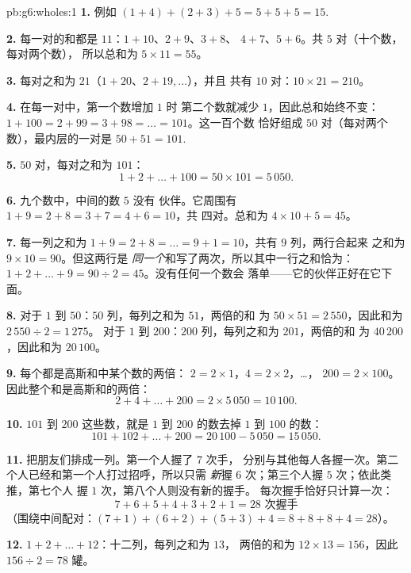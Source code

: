 \begin{solution}{pb:g6:wholes:1}
\textbf{1.} 例如 $(1 + 4) + (2 + 3) + 5 = 5 + 5 + 5 =
15$.

\textbf{2.} 每一对的和都是 $11$：$1 + 10$、$2 + 9$、$3 + 8$、
$4 + 7$、$5 + 6$。共 $5$ 对（十个数，每对两个数），
所以总和为 $5 \times 11 = 55$。

\textbf{3.} 每对之和为 $21$（$1 + 20$、$2 + 19, \dots$），并且
共有 $10$ 对：$10 \times 21 = 210$。

\textbf{4.} 在每一对中，第一个数增加 $1$ 时
第二个数就减少 $1$，因此总和始终不变：
$1 + 100 = 2 + 99 = 3 + 98 = \dots = 101$。这一百个数
恰好组成 $50$ 对（每对两个数），最内层的一对是
$50 + 51 = 101$.

\textbf{5.} $50$ 对，每对之和为 $101$：
\[
1 + 2 + \dots + 100 = 50 \times 101 = 5\,050 .
\]

\textbf{6.} 九个数中，中间的数 $5$ 没有
伙伴。它周围有 $1 + 9 = 2 + 8 = 3 + 7 = 4 + 6 = 10$，共
四对。总和为 $4 \times 10 + 5 = 45$。

\textbf{7.} 每一列之和为 $1 + 9 = 2 + 8 = \dots =
9 + 1 = 10$，共有 $9$ 列，两行合起来
之和为 $9 \times 10 = 90$。但这两行是
\emph{同一个}和写了两次，所以其中一行之和恰为：
$1 + 2 + \dots + 9 = 90 \div 2 = 45$。没有任何一个数会
落单——它的伙伴正好在它下面。

\textbf{8.} 对于 $1$ 到 $50$：$50$ 列，每列之和为 $51$，两倍的和
为 $50 \times 51 = 2\,550$，因此和为 $2\,550 \div 2 = 1\,275$。
对于 $1$ 到 $200$：$200$ 列，每列之和为 $201$，两倍的和
为 $40\,200$，因此和为 $20\,100$。

\textbf{9.} 每个都是高斯和中某个数的两倍：
$2 = 2 \times 1$，$4 = 2 \times 2$，\dots，
$200 = 2 \times 100$。因此整个和是高斯和的两倍：
\[
2 + 4 + \dots + 200 = 2 \times 5\,050 = 10\,100 .
\]

\textbf{10.} $101$ 到 $200$ 这些数，就是
$1$ 到 $200$ 的数去掉 $1$ 到 $100$ 的数：
\[
101 + 102 + \dots + 200 = 20\,100 - 5\,050 = 15\,050 .
\]

\textbf{11.} 把朋友们排成一列。第一个人握了 $7$ 次手，
分别与其他每人各握一次。第二个人已经和第一个人打过招呼，所以只需
\emph{新}握 $6$ 次；第三个人握 $5$ 次；依此类推，第七个人
握 $1$ 次，第八个人则没有新的握手。
每次握手恰好只计算一次：
\[
7 + 6 + 5 + 4 + 3 + 2 + 1 = 28 \text{ 次握手}
\]
（围绕中间配对：$(7+1) + (6+2) + (5+3) + 4 =
8 + 8 + 8 + 4 = 28$）。

\textbf{12.} $1 + 2 + \dots + 12$：十二列，每列之和为 $13$，
两倍的和为 $12 \times 13 = 156$，因此
$156 \div 2 = 78$ 罐。


\end{solution}
